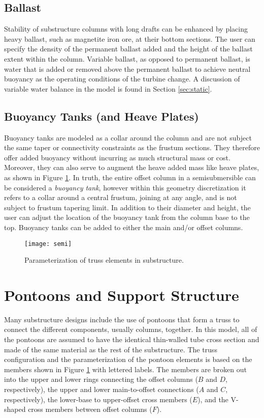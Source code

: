 \subsection{Ballast}
Stability of substructure columns with long drafts can be enhanced by
placing heavy ballast, such as magnetite iron ore, at their bottom
sections.  The user can specify the density of the permanent ballast
added and the height of the ballast extent within the column.  Variable
ballast, as opposed to permanent ballast, is water that is added or
removed above the permanent ballast to achieve neutral buoyancy as the
operating conditions of the turbine change.  A discussion of variable
water balance in the model is found in Section \ref{sec:static}.

\subsection{Buoyancy Tanks (and Heave Plates)}
Buoyancy tanks are modeled as a collar around the column and are not
subject the same taper or connectivity constraints as the frustum
sections.  They therefore offer added buoyancy without incurring as much
structural mass or cost.  Moreover, they can also serve to augment the
heave added mass like heave plates, as shown in Figure
\ref{fig:pontoon}.  In truth, the entire offset column in a
semisubmersible can be considered a \textit{buoyancy tank}, however
within this geometry discretization it refers to a collar around a
central frustum, joining at any angle, and is not subject to frustum
tapering limit.  In addition to their diameter and height, the user can
adjust the location of the buoyancy tank from the column base to the
top. Buoyancy tanks can be added to either the main and/or offset
columns.

\begin{figure}[htb]
  \begin{center}
    \texttt{[image: semi]}
    \caption{Parameterization of truss elements in substructure.}
    \label{fig:pontoon}
  \end{center}
\end{figure}


\section{Pontoons and Support Structure}
Many substructure designs include the use of pontoons that form a truss
to connect the different components, usually columns, together.  In this
model, all of the pontoons are assumed to have the identical thin-walled
tube cross section and made of the same material as the rest of the
substructure.  The truss configuration and the parameterization of the
pontoon elements is based on the members shown in Figure
\ref{fig:pontoon} with lettered labels.  The members are broken out into
the upper and lower rings connecting the offset columns ($B$ and $D$,
respectively), the upper and lower main-to-offset connections ($A$ and
$C$, respectively), the lower-base to upper-offset cross members ($E$),
and the V-shaped cross members between offset columns ($F$).

